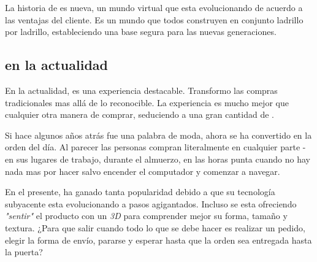 %
%
%

La historia de \ecommerce es nueva, un mundo virtual que esta evolucionando de acuerdo a las ventajas del cliente. Es un mundo que todos construyen en conjunto ladrillo por ladrillo, estableciendo una base segura para las nuevas generaciones.

\subsection{\ecommerce en la actualidad}

En la actualidad, \ecommerce es una experiencia destacable. Transformo las compras tradicionales mas allá de lo reconocible. La experiencia es mucho mejor que cualquier otra manera de comprar, seduciendo a una gran cantidad de \ecommerce \lovers.

Si hace algunos años atrás \ecommerce fue una palabra de moda, ahora se ha convertido en la orden del día. Al parecer las personas compran literalmente en cualquier parte - en sus lugares de trabajo, durante el almuerzo, en las horas punta cuando no hay nada mas por hacer salvo encender el computador y comenzar a navegar.

En el presente, \ecommerce ha ganado tanta popularidad debido a que su tecnología subyacente esta evolucionando a pasos agigantados. Incluso se esta ofreciendo \textit{"sentir"} el producto con un \mouse \textit{3D} para comprender mejor su forma, tamaño y textura. ¿Para que salir cuando todo lo que se debe hacer es realizar un pedido, elegir la forma de envío, pararse y esperar hasta que la orden sea entregada hasta la puerta?

